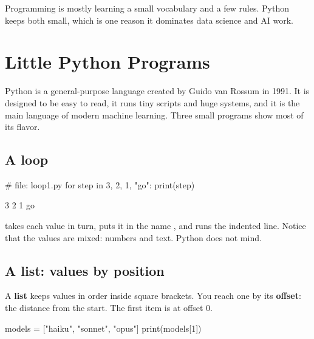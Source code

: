 \begin{keyidea}
Programming is mostly learning a small vocabulary and a few rules. Python keeps both
small, which is one reason it dominates data science and AI work.
\end{keyidea}

\section{Little Python Programs}

Python is a general-purpose language created by Guido van Rossum in 1991. It is
designed to be easy to read, it runs tiny scripts and huge systems, and it is the main
language of modern machine learning. Three small programs show most of its flavor.

\subsection{A loop}

\begin{pycode}
# file: loop1.py
for step in 3, 2, 1, "go":
    print(step)
\end{pycode}
\begin{rawcode}
3
2
1
go
\end{rawcode}

 takes each value in turn, puts it in the name , and runs the
indented line. Notice that the values are mixed: numbers and text. Python does not mind.

\subsection{A list: values by position}

A \textbf{list} keeps values in order inside square brackets. You reach one by its
\textbf{offset}: the distance from the start. The first item is at offset 0.

\begin{pycode}
models = ["haiku", "sonnet", "opus"]
print(models[1])
\end{pycode}

\begin{center}
\end{center}

